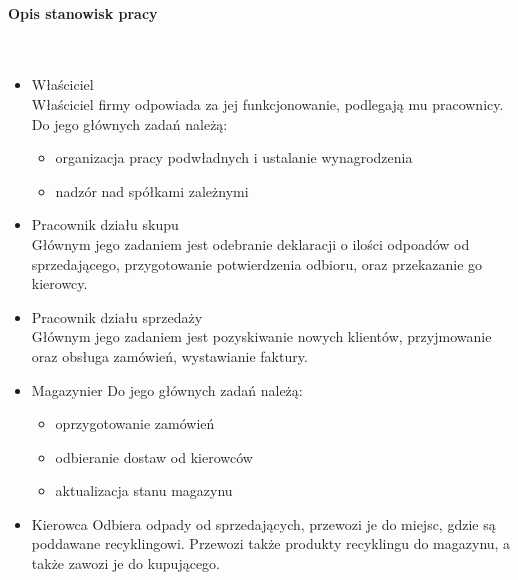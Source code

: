 
\paragraph{Opis stanowisk pracy} \ \\
\begin{itemize}
	\item Właściciel \\ 
	Właściciel firmy odpowiada za jej funkcjonowanie, podlegają mu pracownicy. Do jego głównych zadań należą:
	\begin{itemize}
		\item organizacja pracy podwładnych i ustalanie wynagrodzenia
		\item nadzór nad spółkami zależnymi
	\end{itemize}
	\item Pracownik działu skupu \\
	Głównym jego zadaniem jest odebranie deklaracji o ilości odpoadów od sprzedającego, przygotowanie potwierdzenia odbioru, oraz przekazanie go kierowcy.
	\item Pracownik działu sprzedaży \\ 
	Głównym jego zadaniem jest pozyskiwanie nowych klientów, przyjmowanie oraz obsługa zamówień, wystawianie faktury.
	\item Magazynier 
	Do jego głównych zadań należą:
		\begin{itemize}
		\item oprzygotowanie zamówień
		\item odbieranie dostaw od kierowców
		\item aktualizacja stanu magazynu
		\end{itemize}
	\item Kierowca
	Odbiera odpady od sprzedających, przewozi je do miejsc, gdzie są poddawane recyklingowi. Przewozi także produkty recyklingu do magazynu, a także zawozi je do kupującego.
	
\end{itemize}

